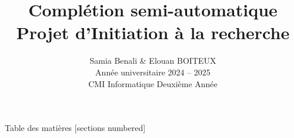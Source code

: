 \documentclass[10pt]{beamer}
\title{\vspace{1cm}Complétion semi-automatique\\Projet d'Initiation à la recherche}
\author{Samia Benali \& Elouan BOITEUX\\[0.3cm]Année universitaire 2024 -- 2025 \\[0.3cm]CMI Informatique Deuxième Année}
\date{}
\begin{document}
\maketitle

\begin{frame}{Table des matières}
	[sections numbered]
	\tableofcontents%
\end{frame}







\end{document}
